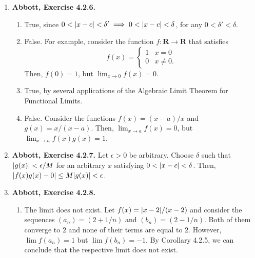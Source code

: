 \documentclass{article}
\DeclarePairedDelimiter\abs{\lvert}{\rvert}
\newcommand{\R}{\mathbf{R}}
\newcommand{\exc}[2][Abbott]{\item \textbf{#1, Exercise #2.}}
\newcommand{\lep}[1][L]{#1et $\epsilon > 0$ be arbitrary}
\begin{document}
\begin{enumerate}
\begin{enumerate}
        \item \lep. Choose $\delta = \min(1, \epsilon/6)$. Now, choose an arbitrary $x$ such that $0 < \abs{x-2} < \delta$. It follows that $\abs{x+3} < 6$. Then, $\abs{(x^2+x-1)-5} = \abs{x+3}\abs{x-2} < 6\abs{x-2} < \epsilon$.
        
        \item \lep. Choose $\delta = \min(1, 6\epsilon)$. Now, choose an arbitrary $x$ such that $0 < \abs{x-3} < \delta$. It follows that $\abs{3x} > 6$. Then,
        \begin{equation*}
            \abs*{\frac{1}{x}-\frac{1}{3}} = \abs*{\frac{x-3}{3x}} < \frac{\abs{x-3}}{6} < \epsilon.
        \end{equation*}
    \end{enumerate}
    
    \exc{4.2.6}
    \begin{enumerate}
        \item True, since $0 < \abs{x-c} < \delta' \implies 0 < \abs{x-c} < \delta$, for any $0 < \delta' < \delta$.
        
        \item False. For example, consider the function $f : \R \to \R$ that satisfies
        \begin{equation*}
            f(x) = \begin{cases}
            1 & x = 0 \\
            0 & x \neq 0.
            \end{cases}
        \end{equation*}Then, $f(0) = 1$, but $\lim_{x \to 0} f(x) = 0$.
        
        \item True, by several applications of the Algebraic Limit Theorem for Functional Limits.
        
        \item False. Consider the functions $f(x) = (x-a)/x$ and $g(x) = x/(x-a)$. Then, $\lim_{x \to a} f(x) = 0$, but $\lim_{x \to a} f(x)g(x) = 1$.
    \end{enumerate}
    
    \exc{4.2.7}
    \lep. Choose $\delta$ such that $\abs{g(x)} < \epsilon/M$ for an arbitrary $x$ satisfying $0 < \abs{x-c} < \delta$. Then, $\abs{f(x)g(x) - 0} \leq M\abs{g(x)} < \epsilon$.
    
    \exc{4.2.8}
    \begin{enumerate}
        \item The limit does not exist. Let $f(x) = \abs{x-2}/(x-2)$ and consider the sequences $(a_n) = (2+1/n)$ and $(b_n) = (2-1/n)$. Both of them converge to $2$ and none of their terms are equal to $2$. However, $\lim f(a_n) = 1$ but $\lim f(b_n) = -1$. By Corollary 4.2.5, we can conclude that the respective limit does not exist.
        

\end{enumerate}
\end{enumerate}
\end{document}
